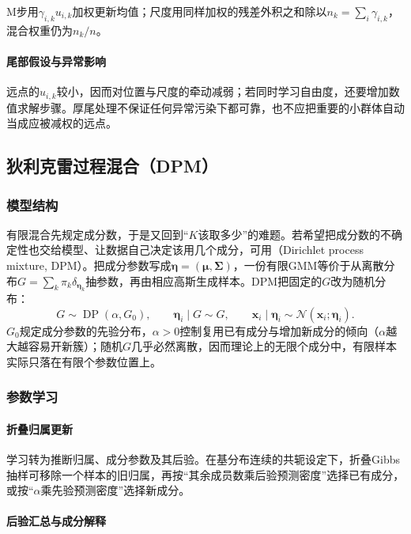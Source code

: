 M步用$\gamma_{i,k}u_{i,k}$加权更新均值；尺度用同样加权的残差外积之和除以$n_k=\sum_i\gamma_{i,k}$，混合权重仍为$n_k/n$。

\paragraph{尾部假设与异常影响}

远点的$u_{i,k}$较小，因而对位置与尺度的牵动减弱；若同时学习自由度，还要增加数值求解步骤。厚尾处理不保证任何异常污染下都可靠，也不应把重要的小群体自动当成应被减权的远点。
\subsection{狄利克雷过程混合（DPM）}

\subsubsection{模型结构}

有限混合先规定成分数，于是又回到“$K$该取多少”的难题。若希望把成分数的不确定性也交给模型、让数据自己决定该用几个成分，可用（Dirichlet process mixture, DPM）。把成分参数写成$\bm\eta=(\bm\mu,\bm\Sigma)$，一份有限GMM等价于从离散分布$G=\sum_k\pi_k\delta_{\bm\eta_k}$抽参数，再由相应高斯生成样本。DPM把固定的$G$改为随机分布：
\[
 G\sim\operatorname{DP}(\alpha,G_0),\qquad
 \bm\eta_i\mid G\sim G,\qquad
 \bm x_i\mid\bm\eta_i\sim\mathcal N(\bm x_i;\bm\eta_i).
\]
$G_0$规定成分参数的先验分布，$\alpha>0$控制复用已有成分与增加新成分的倾向（$\alpha$越大越容易开新簇）；随机$G$几乎必然离散，因而理论上的无限个成分中，有限样本实际只落在有限个参数位置上。

\subsubsection{参数学习}

\paragraph{折叠归属更新}

学习转为推断归属、成分参数及其后验。在基分布连续的共轭设定下，折叠Gibbs抽样可移除一个样本的旧归属，再按“其余成员数乘后验预测密度”选择已有成分，或按“$\alpha$乘先验预测密度”选择新成分。

\paragraph{后验汇总与成分解释}

